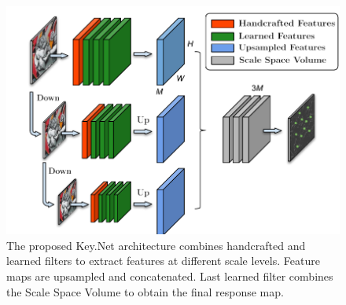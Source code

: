 \begin{figure}
 \centering
 \hspace*{-1cm}    
   \includegraphics[scale=0.55]{main/chapter02/figures/keynet_inference.pdf}
   \vspace{-0.20cm}
    \caption{The proposed Key.Net architecture combines handcrafted and learned filters to extract features at different scale levels. Feature maps are upsampled and concatenated. Last learned filter combines the Scale Space Volume to obtain the final response map.}
    \label{fig:net_architecture}
\end{figure} 

